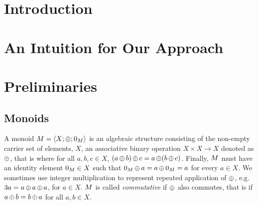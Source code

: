 \documentclass[acmsmall,review,anonymous,screen]{acmart}\settopmatter{printfolios=true,printccs=true,printacmref=true}
\theoremstyle{definition}
\begin{document}




\maketitle


\section{Introduction}\label{sec:introduction}


\section{An Intuition for Our Approach}\label{sec:intuition}


\section{Preliminaries}\label{sec:preliminaries}

\subsection{Monoids}

A monoid $M = \left\langle X;\operatorname{\oplus};0_{M}\right\rangle$ is an algebraic structure
consisting of the non-empty carrier set of elements, $X$, an associative binary operation
$X \times X \rightarrow X$ denoted as $\operatorname{\oplus}$, that is where for all $a, b,
c \in X$, $(a \operatorname{\oplus} b) \operatorname{\oplus} c = a \operatorname{\oplus} (b \operatorname{\oplus} c)$. Finally,
$M$ must have an identity element $0_{M} \in X$ such that
$0_{M} \operatorname{\oplus} a = a \operatorname{\oplus} 0_{M} =   a$ for every $a \in X$.
We sometimes use integer multiplication to represent repeated application of
$\operatorname{\oplus}$, e.g. $3a = a \operatorname{\oplus} a \operatorname{\oplus} a$, for $a \in X$. $M$ is
called \textit{commutative} if $\operatorname{\oplus}$ also commutes, that is if $a
\operatorname{\oplus} b = b \operatorname{\oplus} a$ for all $a, b \in X$. 
\end{document}
